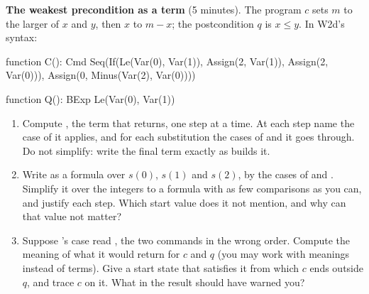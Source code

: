\documentclass[11pt]{article}
\begin{document}
\begin{problem}\label{prob:B1}
\textbf{The weakest precondition as a term} (5 minutes). The program $c$ sets
$m$ to the larger of $x$ and $y$, then $x$ to $m - x$; the postcondition $q$
is $x \leq y$. In W2d's syntax:
\begin{dafnycode}
function C(): Cmd
{
  Seq(If(Le(Var(0), Var(1)), Assign(2, Var(1)), Assign(2, Var(0))),
      Assign(0, Minus(Var(2), Var(0))))
}

function Q(): BExp
{
  Le(Var(0), Var(1))
}
\end{dafnycode}
\begin{enumerate}
\item[(a)] Compute , the term that  returns, one
  step at a time. At each step name the case of  it applies, and for
  each substitution the cases of  and  it goes
  through. Do not simplify: write the final term exactly as  builds it.
\item[(b)] Write  as a formula over $s(0)$,
  $s(1)$ and $s(2)$, by the cases of  and . Simplify it
  over the integers to a formula with as few comparisons as you can, and
  justify each step. Which start value does it not mention, and why can that
  value not matter?
\item[(c)] Suppose 's  case read , the
  two commands in the wrong order. Compute the meaning of what it would return
  for $c$ and $q$ (you may work with meanings instead of terms). Give a start
  state that satisfies it from which $c$ ends outside $q$, and trace $c$ on it.
  What in the result should have warned you?
\end{enumerate}
\end{problem}
\end{document}
